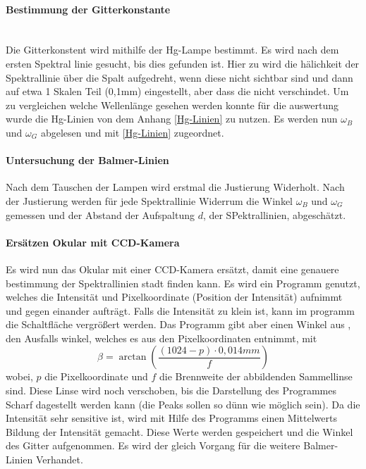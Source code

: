 \paragraph{Bestimmung der Gitterkonstante}\\

Die Gitterkonstent wird mithilfe der Hg-Lampe bestimmt.
Es wird nach dem ersten Spektral linie gesucht, bis dies gefunden ist. 
Hier zu wird die hälichkeit der Spektrallinie über die Spalt aufgedreht, wenn diese nicht sichtbar sind und dann auf etwa 1 Skalen Teil (0,1mm) eingestellt, aber dass die nicht verschindet.
Um zu vergleichen welche Wellenlänge gesehen werden konnte für die auswertung wurde die Hg-Linien von dem Anhang \cref{Hg-Linien} zu nutzen.
Es werden nun $\omega_B$ und $\omega_G$ abgelesen und mit \cref{Hg-Linien} zugeordnet.

\paragraph{Untersuchung der Balmer-Linien}
Nach dem Tauschen der Lampen wird erstmal die Justierung Widerholt. 
Nach der Justierung werden für jede Spektrallinie Widerrum die Winkel $\omega_B$ und $\omega_G$ gemessen und der Abstand der Aufspaltung $d$, der SPektrallinien, abgeschätzt.

\paragraph{Ersätzen Okular mit CCD-Kamera}
Es wird nun das Okular mit einer CCD-Kamera ersätzt, damit eine genauere bestimmung der Spektrallinien stadt finden kann. 
Es wird ein Programm genutzt, welches die Intensität und Pixelkoordinate (Position der Intensität) aufnimmt und gegen einander aufträgt. 
Falls die Intensität zu klein ist, kann im programm die Schaltfläche vergrößert werden.
Das Programm gibt aber einen Winkel aus , den Ausfalls winkel, welches es aus den Pixelkoordinaten entnimmt, mit 
\begin{equation}
    \beta = \arctan(\frac{(1024-p)\cdot0,014mm}{f})
\end{equation}
wobei, $p$ die Pixelkoordinate und $f$ die Brennweite der abbildenden Sammellinse sind.
Diese Linse wird noch verschoben, bis die Darstellung des Programmes Scharf dagestellt werden kann (die Peaks sollen so dünn wie möglich sein).
Da die Intensität sehr sensitive ist, wird mit Hilfe des Programms einen Mittelwerts Bildung der Intensität gemacht. 
Diese Werte werden gespeichert und die Winkel des Gitter aufgenommen. 
Es wird der gleich Vorgang für die weitere Balmer-Linien Verhandet.

